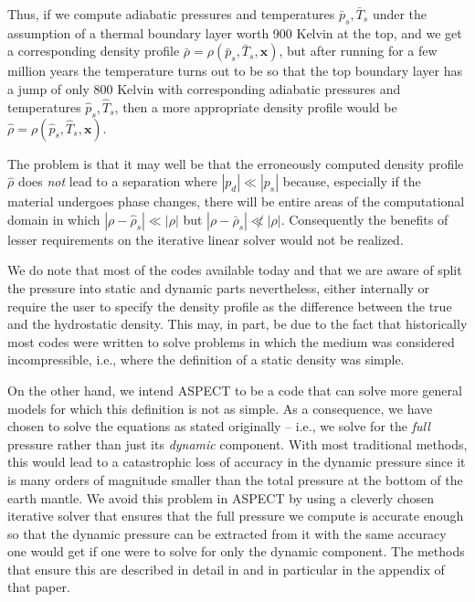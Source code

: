 \documentclass{article}
\newcommand{\aspect}{\textsc{ASPECT}}
\begin{document}
\begin{itemize}
  Thus, if we compute adiabatic pressures and
  temperatures $\bar p_s,\bar T_s$ under the assumption of a thermal boundary layer
  worth 900 Kelvin at the top, and we get a corresponding density profile
  $\bar\rho=\rho(\bar p_s,\bar T_s, \mathbf x)$, but after running for a few
  million years the temperature turns out to be so that the top boundary layer
  has a jump of only 800 Kelvin with corresponding adiabatic pressures and
  temperatures $\hat p_s,\hat T_s$, then a more appropriate density profile
  would be $\hat\rho=\rho(\hat p_s,\hat T_s, \mathbf x)$.

  The problem is that it may well be that the erroneously computed density
  profile $\hat \rho$ does \textit{not} lead to a separation where
  $|p_d|\ll|p_s|$ because, especially if the material undergoes phase changes,
  there will be entire areas of the computational domain in which $|\rho-\hat
  \rho_s|\ll |\rho|$ but $|\rho-\bar
  \rho_s|\not\ll |\rho|$. Consequently the benefits of lesser requirements on the
  iterative linear solver would not be realized.
\end{itemize}

We do note that most of the codes available today and that we are aware of
split the pressure into static and dynamic parts nevertheless, either
internally or require the user to specify the density profile as the
difference between the true and the hydrostatic density. This may, in part, be
due to the fact that historically most codes were written to solve problems
in which the medium was considered incompressible, i.e., where the definition
of a static density was simple.

On the other hand, we intend \aspect{} to be a code that can solve more
general models for which this definition is not as simple. As a consequence, we
have chosen to solve the equations as stated originally -- i.e., we solve for
the \textit{full} pressure rather than just its \textit{dynamic} component. With
most traditional methods, this would lead to a catastrophic loss of accuracy in the
dynamic pressure since it is many orders of magnitude smaller than the total
pressure at the bottom of the earth mantle. We avoid this problem in \aspect{}
by using a cleverly chosen iterative solver that ensures that the full pressure
we compute is accurate enough so that the dynamic pressure can be extracted from
it with the same accuracy one would get if one were to solve for only the
dynamic component. The methods that ensure this are described in detail in
\cite{KHB12} and in particular in the appendix of that paper.
\end{document}
